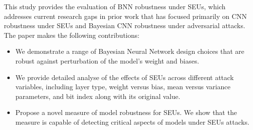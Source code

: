 This study provides the evaluation of BNN robustness under SEUs, which addresses current research gaps in prior work that has focused primarily on CNN robustness under SEUs and Bayesian CNN robustness under adversarial attacks.  The paper makes the following contributions:

\begin{itemize}
    \item We demonstrate a range of Bayesian Neural Network design choices that are robust against perturbation of the model's weight and  biases.
    \item We provide detailed analyse of the effects of SEUs across different attack variables, including layer type, weight versus bias, mean versus variance parameters, and bit index along with its original value.
    \item Propose a novel measure of model robustness for SEUs.  We show that the measure is capable of detecting critical aspects of models under SEUs attacks.
    
\end{itemize}

% 


